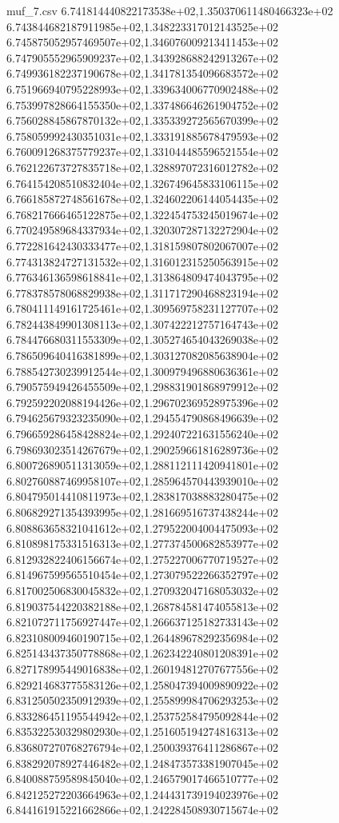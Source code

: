 \begin{filecontents*}{muf_7.csv}
6.741814440822173538e+02,1.350370611480466323e+02
6.743844682187911985e+02,1.348223317012143525e+02
6.745875052957469507e+02,1.346076009213411453e+02
6.747905552965909237e+02,1.343928688242913267e+02
6.749936182237190678e+02,1.341781354096683572e+02
6.751966940795228993e+02,1.339634006770902488e+02
6.753997828664155350e+02,1.337486646261904752e+02
6.756028845867870132e+02,1.335339272565670399e+02
6.758059992430351031e+02,1.333191885678479593e+02
6.760091268375779237e+02,1.331044485596521554e+02
6.762122673727835718e+02,1.328897072316012782e+02
6.764154208510832404e+02,1.326749645833106115e+02
6.766185872748561678e+02,1.324602206144054435e+02
6.768217666465122875e+02,1.322454753245019674e+02
6.770249589684337934e+02,1.320307287132272904e+02
6.772281642430333477e+02,1.318159807802067007e+02
6.774313824727131532e+02,1.316012315250563915e+02
6.776346136598618841e+02,1.313864809474043795e+02
6.778378578068829938e+02,1.311717290468823194e+02
6.780411149161725461e+02,1.309569758231127707e+02
6.782443849901308113e+02,1.307422212757164743e+02
6.784476680311553309e+02,1.305274654043269038e+02
6.786509640416381899e+02,1.303127082085638904e+02
6.788542730239912544e+02,1.300979496880636361e+02
6.790575949426455509e+02,1.298831901868979912e+02
6.792592202088194426e+02,1.296702369528975396e+02
6.794625679323235090e+02,1.294554790868496639e+02
6.796659286458428824e+02,1.292407221631556240e+02
6.798693023514267679e+02,1.290259661816289736e+02
6.800726890511313059e+02,1.288112111420941801e+02
6.802760887469958107e+02,1.285964570443939010e+02
6.804795014410811973e+02,1.283817038883280475e+02
6.806829271354393995e+02,1.281669516737438244e+02
6.808863658321041612e+02,1.279522004004475093e+02
6.810898175331516313e+02,1.277374500682853977e+02
6.812932822406156674e+02,1.275227006770719527e+02
6.814967599565510454e+02,1.273079522266352797e+02
6.817002506830045832e+02,1.270932047168053032e+02
6.819037544220382188e+02,1.268784581474055813e+02
6.821072711756927447e+02,1.266637125182733143e+02
6.823108009460190715e+02,1.264489678292356984e+02
6.825143437350778868e+02,1.262342240801208391e+02
6.827178995449016838e+02,1.260194812707677556e+02
6.829214683775583126e+02,1.258047394009890922e+02
6.831250502350912939e+02,1.255899984706293253e+02
6.833286451195544942e+02,1.253752584795092844e+02
6.835322530329802930e+02,1.251605194274816313e+02
6.836807270768276794e+02,1.250039376411286867e+02
6.838292078927446482e+02,1.248473573381907045e+02
6.840088759589845040e+02,1.246579017466510777e+02
6.842125272203664963e+02,1.244431739194023976e+02
6.844161915221662866e+02,1.242284508930715674e+02

\end{filecontents*}
